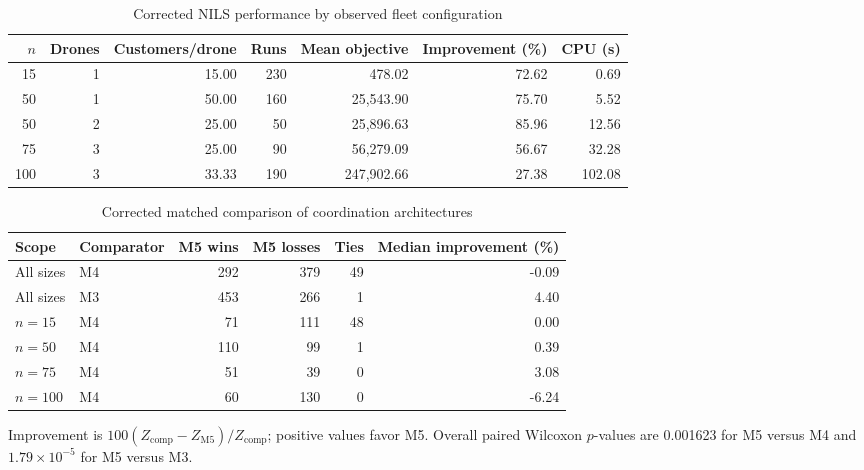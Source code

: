 \begin{table}[htbp]
\centering
\caption{Corrected NILS performance by observed fleet configuration}
\label{tab:fleet_configuration_corrected}
\small
\begin{tabular}{rrrrrrr}
\toprule
$n$ & Drones & Customers/drone & Runs & Mean objective & Improvement (\%) & CPU (s) \\
\midrule
15 & 1 & 15.00 & 230 & 478.02 & 72.62 & 0.69 \\
50 & 1 & 50.00 & 160 & 25,543.90 & 75.70 & 5.52 \\
50 & 2 & 25.00 & 50 & 25,896.63 & 85.96 & 12.56 \\
75 & 3 & 25.00 & 90 & 56,279.09 & 56.67 & 32.28 \\
100 & 3 & 33.33 & 190 & 247,902.66 & 27.38 & 102.08 \\
\bottomrule
\end{tabular}
\end{table}

\begin{table}[htbp]
\centering
\caption{Corrected matched comparison of coordination architectures}
\label{tab:architecture_comparison_corrected}
\small
\begin{tabular}{llrrrr}
\toprule
Scope & Comparator & M5 wins & M5 losses & Ties & Median improvement (\%) \\
\midrule
All sizes & M4 & 292 & 379 & 49 & -0.09 \\
All sizes & M3 & 453 & 266 & 1 & 4.40 \\
$n=15$ & M4 & 71 & 111 & 48 & 0.00 \\
$n=50$ & M4 & 110 & 99 & 1 & 0.39 \\
$n=75$ & M4 & 51 & 39 & 0 & 3.08 \\
$n=100$ & M4 & 60 & 130 & 0 & -6.24 \\
\bottomrule
\end{tabular}
\begin{flushleft}\footnotesize Improvement is $100(Z_{\mathrm{comp}}-Z_{\mathrm{M5}})/Z_{\mathrm{comp}}$; positive values favor M5. Overall paired Wilcoxon $p$-values are 0.001623 for M5 versus M4 and $1.79\times10^{-5}$ for M5 versus M3.\end{flushleft}
\end{table}

